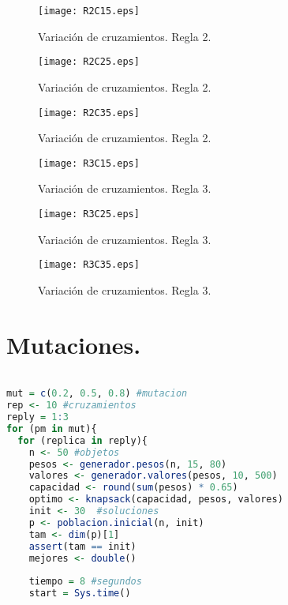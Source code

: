 \documentclass{article}
\begin{document}
\begin{figure}[htb] %
    \centering
    \texttt{[image: R2C15.eps]} %
    \caption{Variaci\'on de cruzamientos. Regla 2.}
    \label{Figura 4}
\end{figure}
\begin{figure}[htb] %
    \centering
    \texttt{[image: R2C25.eps]} %
    \caption{Variaci\'on de cruzamientos. Regla 2.}
    \label{Figura 5}
\end{figure}
\begin{figure}[htb] %
    \centering
    \texttt{[image: R2C35.eps]} %
    \caption{Variaci\'on de cruzamientos. Regla 2.}
    \label{Figura 6}
\end{figure}
\begin{figure}[htb] %
    \centering
    \texttt{[image: R3C15.eps]} %
    \caption{Variaci\'on de cruzamientos. Regla 3.}
    \label{Figura 7}
\end{figure}
\begin{figure}[htb] %
    \centering
    \texttt{[image: R3C25.eps]} %
    \caption{Variaci\'on de cruzamientos. Regla 3.}
    \label{Figura 8}
\end{figure}
\begin{figure}[htb] %
    \centering
    \texttt{[image: R3C35.eps]} %
    \caption{Variaci\'on de cruzamientos. Regla 3.}
    \label{Figura 9}
\end{figure}

\newpage
\section{Mutaciones.}
\begin{lstlisting}[language=R, caption= Segmento de c\'odigo Mutaciones.]

mut = c(0.2, 0.5, 0.8) #mutacion
rep <- 10 #cruzamientos
reply = 1:3
for (pm in mut){
  for (replica in reply){
    n <- 50 #objetos
    pesos <- generador.pesos(n, 15, 80)
    valores <- generador.valores(pesos, 10, 500)
    capacidad <- round(sum(pesos) * 0.65)
    optimo <- knapsack(capacidad, pesos, valores)
    init <- 30  #soluciones
    p <- poblacion.inicial(n, init)
    tam <- dim(p)[1]
    assert(tam == init)
    mejores <- double()
    
    tiempo = 8 #segundos
    start = Sys.time()
\end{lstlisting}
\end{document}
